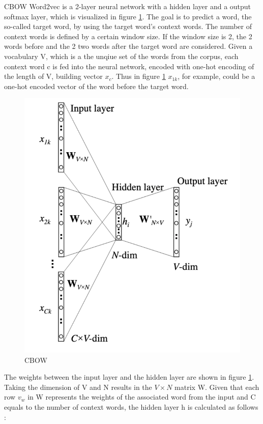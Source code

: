 \documentclass[12pt, a4paper, titlepage]{article}
\begin{document}
\ac{CBOW} Word2vec is a 2-layer neural network with a hidden layer and a output softmax layer, which is visualized in figure \ref{fig: F1}. The goal is to predict a word, the so-called target word, by using the target word's context words. The number of context words is defined by a certain window size. If the window size is 2, the 2 words before and the 2 two words after the target word are considered. Given a vocabulary V, which is a the unqiue set of the words from the corpus, each context word c is fed into the neural network, encoded with one-hot encoding of the length of V, building vector $x_c$. Thus in figure \ref*{fig: F1} $x_{1k}$, for example, could be a one-hot encoded vector of the word before the target word. 

\begin{figure}[]
  \center
  \includegraphics[scale=0.5]{word2vecCBOW.png}
  \caption{\label{fig: F1} \ac{CBOW} \citep[6]{rong2014}}
\end{figure}

The weights between the input layer and the hidden layer are shown in figure \ref{fig: F1}. Taking the dimension of V and N results in the $V \times N$ matrix W. Given that each row $v_w$ in W represents the weights of the associated word from the input and C equals to the number of context words, the hidden layer h is calculated as follows \citep{rong2014}:
\end{document}
